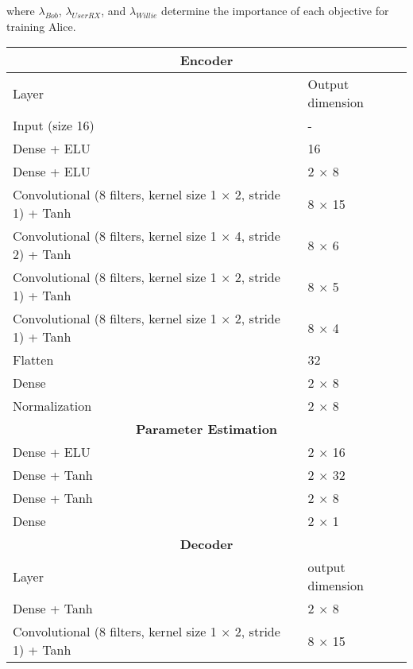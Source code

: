 where \(\lambda_{Bob}\), \(\lambda_{UserRX}\), and \(\lambda_{Willie}\) determine the importance of each objective for training Alice.
\iffalse Algorithm (?) summarizes our approach for optimizing the whole system. \fi
\begin{table}[bp!]
	\begin{adjustbox}{width=0.85\columnwidth,center}
		\begin{tabular}{|l|l|} 
			\hline
			\multicolumn{2}{|c|}{\textbf{Encoder}} 															\\
			\hline
			Layer 																	&	Output dimension	\\
			\hline
			Input (size 16)      												&	-    	 		    \\ 
			Dense + ELU          													&	16					\\
			Dense + ELU   															&	2 $\times$ 8		\\
			Convolutional (8 filters, kernel size 1 $\times$ 2, stride 1) + Tanh 	&   8 $\times$ 15		\\
			Convolutional (8 filters, kernel size 1 $\times$ 4, stride 2) + Tanh 	&   8 $\times$ 6		\\
			Convolutional (8 filters, kernel size 1 $\times$ 2, stride 1) + Tanh 	&   8 $\times$ 5		\\
			Convolutional (8 filters, kernel size 1 $\times$ 2, stride 1) + Tanh 	&   8 $\times$ 4		\\
			Flatten															 		&   32					\\
			Dense																	&	2 $\times$ 8		\\
			Normalization															&	2 $\times$ 8		\\
			\hline   
			\hline												
			\multicolumn{2}{|c|}{\textbf{Parameter Estimation}} 											\\
			\hline
			Dense + ELU																&	2 $\times$ 16		\\
			Dense + Tanh															&	2 $\times$ 32		\\
			Dense + Tanh															&	2 $\times$ 8		\\
			Dense																	&	2 $\times$	1		\\
			\hline
			\hline
			\multicolumn{2}{|c|}{\textbf{Decoder}}															\\
			\hline
			Layer 																	&	output dimension	\\
			\hline
			Dense + Tanh          													&	2 $\times$ 8		\\
			Convolutional (8 filters, kernel size 1 $\times$ 2, stride 1) + Tanh 	&   8 $\times$ 15		\\

\end{tabular}
\end{adjustbox}
\end{table}
